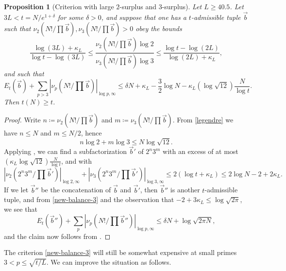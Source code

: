 \documentclass[12pt,a4paper,reqno]{amsart}
\numberwithin{equation}{section}
\theoremstyle{plain}
\newtheorem{proposition}[theorem]{Proposition}
\theoremstyle{definition}
\begin{document}
\begin{proposition}[Criterion with large $2$-surplus and $3$-surplus]\label{balance-23}  Let $L \geq 40.5$.
  Let $3L < t = N/e^{1+\delta}$ for some $\delta>0$, and suppose that one has a $t$-admissible tuple $\vec b$ such that $\nu_2(N!/\prod \vec b), \nu_3(N!/\prod \vec b) > 0$ obey the bounds
$$
\frac{\log(3L)+\kappa_L}{\log t - \log(3L)} \leq \frac{\nu_2(N!/\prod \vec b) \log 2}{\nu_3(N!/\prod \vec b) \log 3} \leq \frac{\log t - \log(2L)}{\log(2L)+\kappa_L},
$$
and such that
  \begin{equation}\label{new-balance-3}
      E_t(\vec b) + \sum_{p>3} |\nu_p(N!/\prod \vec b)|_{\log p,\infty} \leq \delta N + \kappa_L - \frac{3}{2} \log N - \kappa_L (\log \sqrt{12}) \frac{N}{\log t}.
  \end{equation}
  Then $t(N) \geq t$.
\end{proposition}
  

\begin{proof} Write $n \coloneqq \nu_2(N!/\prod \vec b)$ and $m \coloneqq \nu_3(N!/\prod \vec b)$.  From \eqref{legendre} we have $n \leq N$ and $m \leq N/2$, hence
  $$ n \log 2 + m \log 3 \leq N \log \sqrt{12}.$$
Applying , we can find a subfactorization $\vec b'$ of $2^n 3^m$ with an excess of at most $(\kappa_L \log \sqrt{12}) \frac{N}{\log t}$, and with
$$ |\nu_2(2^n 3^m/\prod \vec b')|_{\log 2,\infty}
+ |\nu_3(2^n 3^m/\prod \vec b')|_{\log 3,\infty}
 \leq 2(\log t + \kappa_L) \leq 2 \log N - 2 + 2 \kappa_L.$$
 If we let $\vec b''$ be the concatenation of $\vec b$ and $\vec b'$, then $\vec b''$ is another $t$-admissible tuple, and from \eqref{new-balance-3} and the observation that $-2+3\kappa_L \leq \log \sqrt{2\pi}$, we see that
 $$
 E_t(\vec b'') + \sum_{p} |\nu_p(N!/\prod \vec b'')|_{\log p,\infty} \leq \delta N + \log \sqrt{2\pi N},$$
 and the claim now follows from .
\end{proof}

The criterion \eqref{new-balance-3} will still be somewhat expensive at small primes $3 < p \leq \sqrt{t/L}$.  We can improve the situation as follows.
\end{document}
